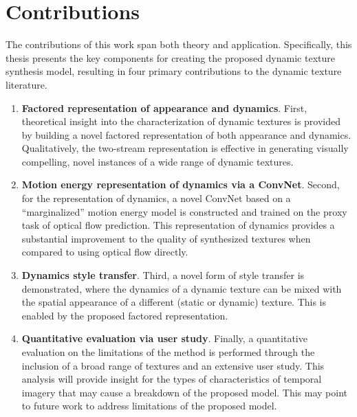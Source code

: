 \section{Contributions}

The contributions of this work span both theory and application. Specifically, this thesis presents the key components for creating the proposed dynamic texture synthesis model, resulting in four primary contributions to the dynamic texture literature.

\begin{enumerate}
	\item \textbf{Factored representation of appearance and dynamics}. First, theoretical insight into the characterization of dynamic textures is provided by building a novel factored representation of both appearance and dynamics. Qualitatively, the two-stream representation is effective in generating visually compelling, novel instances of a wide range of dynamic textures.
	\item \textbf{Motion energy representation of dynamics via a ConvNet}. Second, for the representation of dynamics, a novel ConvNet based on a ``marginalized'' motion energy model \cite{derpanis2010role,derpanis2012spacetime} is constructed and trained on the proxy task of optical flow prediction. This representation of dynamics provides a substantial improvement to the quality of synthesized textures when compared to using optical flow directly.
	\item \textbf{Dynamics style transfer}. Third, a novel form of style transfer is demonstrated, where the dynamics of a dynamic texture can be mixed with the spatial appearance of a different (static or dynamic) texture. This is enabled by the proposed factored representation.
	\item \textbf{Quantitative evaluation via user study}. Finally, a quantitative evaluation on the limitations of the method is performed through the inclusion of a broad range of textures and an extensive user study. This analysis will provide insight for the types of characteristics of temporal imagery that may cause a breakdown of the proposed model. This may point to future work to address limitations of the proposed model.
\end{enumerate}